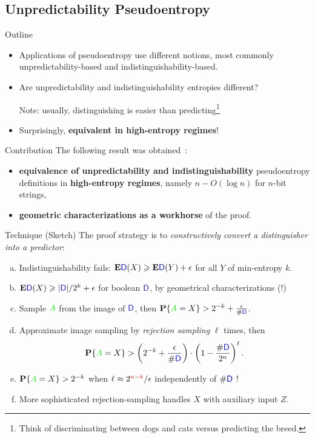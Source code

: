 \documentclass[9pt]{beamer}					%
\begin{document}
\subsection{Unpredictability Pseudoentropy }

\begin{frame}{Outline}
\begin{itemize}
\item[\emoji{open-book}] Applications of pseudoentropy use different notions, most commonly unpredictability-based and indistinguishability-based.
\item[\emoji{question}] Are unpredictability and indistinguishability entropies different? 

Note: usually, distinguishing is easier than predicting\footnote{Think of discriminating between dogs and cats versus predicting the breed.}
\item[\emoji{raised-hand}] Surprisingly, \textbf{equivalent in high-entropy regimes}!
\end{itemize}
\end{frame}

\begin{frame}{Contribution}
The following result was obtained~\cite{DBLP:conf/icalp/SkorskiGP15}:
\begin{itemize}
    \item[\emoji{key}] \textbf{equivalence of unpredictability and indistinguishability} pseudoentropy definitions in \textbf{high-entropy regimes}, namely $n-O(\log n)$ for $n$-bit strings,
    \item[\emoji{key}] \textbf{geometric characterizations as a workhorse} of the proof.
\end{itemize}
\end{frame}

\begin{frame}{Technique (Sketch)}
The proof strategy is to \emph{constructively convert a distinguisher into a predictor}:
\newcommand{\D}{\textcolor{blue}{\mathsf{D}}}
\begin{enumerate}[(a)]
    \item Indistinguishability fails: $\mathbf{E}\D(X)\geqslant \mathbf{E}\D(Y)+\epsilon$ for all $Y$ of min-entropy $k$.
    \item $\mathbf{E}\D(X)\geqslant |\D|/2^{k}+\epsilon$ for boolean $\D$, by geometrical characterizations (!)
    \item Sample $\textcolor{green}{A}$ from the image of $\D$, then $\mathbf{P}\{\textcolor{green}{A} = X\} > 2^{-k}+\frac{\epsilon}{\#\D}$.
    \item Approximate image sampling by \emph{rejection sampling} $\ell$ times, then
    $$\mathbf{P}\{\textcolor{green}{A} = X\} > \left( 2^{-k}+\frac{\epsilon}{\#\D} \right)\cdot \left(1-\frac{\# \D}{2^n}\right)^{\ell}.$$
    \item $\mathbf{P}\{\textcolor{green}{A} = X\} > 2^{-k}$  when $\ell \approx 2^{\textcolor{red}{n-k}}/\epsilon$ independently of $\# \D$ !
    \item[\emoji{warning}] More sophisticated rejection-sampling handles $X$ with auxiliary input $Z$.
\end{enumerate}
\end{frame}
\end{document}
